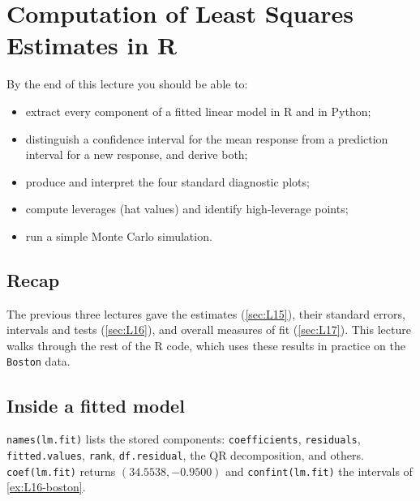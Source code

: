 \section{Computation of Least Squares Estimates in R}\label{sec:L18}


\begin{guiding*}
By the end of this lecture you should be able to:
\begin{itemize}
  \item extract every component of a fitted linear model in R and in Python;
  \item distinguish a confidence interval for the mean response from a prediction interval for a new response, and derive both;
  \item produce and interpret the four standard diagnostic plots;
  \item compute leverages (hat values) and identify high-leverage points;
  \item run a simple Monte Carlo simulation.
\end{itemize}
\end{guiding*}

\subsection{Recap}
The previous three lectures gave the estimates (\cref{sec:L15}), their standard errors, intervals and tests
(\cref{sec:L16}), and overall measures of fit (\cref{sec:L17}). This lecture walks through the rest of the R
code, which uses these results in practice on the \texttt{Boston} data.

\subsection{Inside a fitted model}
\texttt{names(lm.fit)} lists the stored components: \texttt{coefficients}, \texttt{residuals},
\texttt{fitted.values}, \texttt{rank}, \texttt{df.residual}, the QR decomposition, and others. \texttt{coef(lm.fit)} returns
$(34.5538,-0.9500)$ and \texttt{confint(lm.fit)} the intervals of \cref{ex:L16-boston}.

